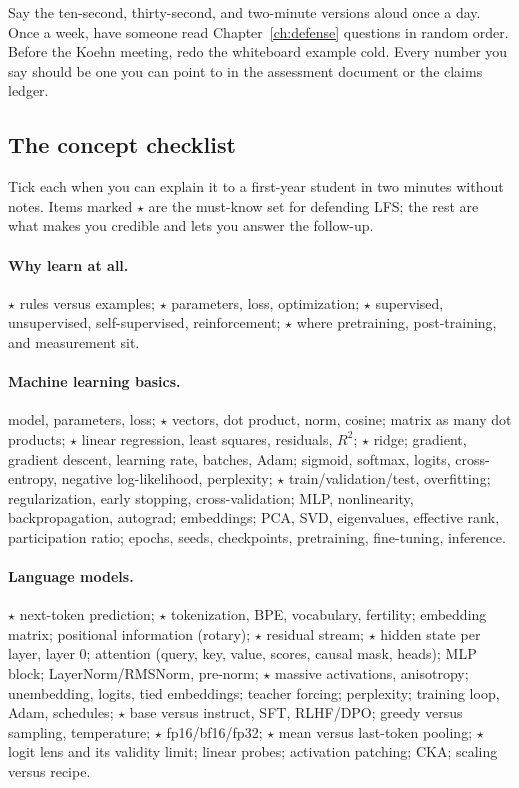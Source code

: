 Say the ten-second, thirty-second, and two-minute versions aloud once a day.
Once a week, have someone read Chapter~\ref{ch:defense} questions in random
order. Before the Koehn meeting, redo the whiteboard example cold. Every
number you say should be one you can point to in the assessment document or
the claims ledger.

\subsection{The concept checklist}

Tick each when you can explain it to a first-year student in two minutes
without notes. Items marked $\star$ are the must-know set for defending
LFS; the rest are what makes you credible and lets you answer the follow-up.

\paragraph{Why learn at all.}
$\star$ rules versus examples; $\star$ parameters, loss, optimization;
$\star$ supervised, unsupervised, self-supervised, reinforcement;
$\star$ where pretraining, post-training, and measurement sit.

\paragraph{Machine learning basics.}
model, parameters, loss; $\star$ vectors, dot product, norm, cosine; matrix
as many dot products; $\star$ linear regression, least squares, residuals,
$R^2$; $\star$ ridge; gradient, gradient descent, learning rate, batches,
Adam; sigmoid, softmax, logits, cross-entropy, negative log-likelihood,
perplexity; $\star$ train/validation/test, overfitting; regularization,
early stopping, cross-validation; MLP, nonlinearity, backpropagation,
autograd; embeddings; PCA, SVD, eigenvalues, effective rank, participation
ratio; epochs, seeds, checkpoints, pretraining, fine-tuning, inference.

\paragraph{Language models.}
$\star$ next-token prediction; $\star$ tokenization, BPE, vocabulary,
fertility; embedding matrix; positional information (rotary); $\star$
residual stream; $\star$ hidden state per layer, layer 0; attention (query,
key, value, scores, causal mask, heads); MLP block; LayerNorm/RMSNorm,
pre-norm; $\star$ massive activations, anisotropy; unembedding, logits, tied
embeddings; teacher forcing; perplexity; training loop, Adam, schedules;
$\star$ base versus instruct, SFT, RLHF/DPO; greedy versus sampling,
temperature; $\star$ fp16/bf16/fp32; $\star$ mean versus last-token pooling;
$\star$ logit lens and its validity limit; linear probes; activation
patching; CKA; scaling versus recipe.

